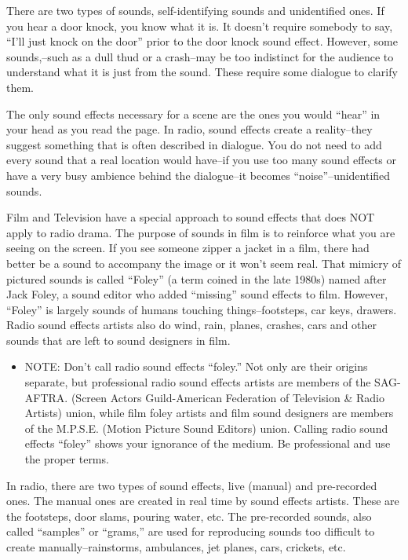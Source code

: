 \documentclass[openleft,oneside,showtrims]{memoir}
\begin{document}
There are two types of sounds, self-identifying sounds and unidentified ones. If you hear a door knock, you know what it is. It doesn't require somebody to say, ``I'll just knock on the door'' prior to the door knock sound effect. However, some sounds,--such as a dull thud or a crash--may be too indistinct for the audience to understand what it is just from the sound. These require some dialogue to clarify them.

The only sound effects necessary for a scene are the ones you would ``hear'' in your head as you read the page. In radio, sound effects create a reality--they suggest something that is often described in dialogue. You do not need to add every sound that a real location would have--if you use too many sound effects or have a very busy ambience behind the dialogue--it becomes ``noise''--unidentified sounds.

Film and Television have a special approach to sound effects that does NOT apply to radio drama. The purpose of sounds in film is to reinforce what you are seeing on the screen. If you see someone zipper a jacket in a film, there had better be a sound to accompany the image or it won't seem real. That mimicry of pictured sounds is called ``Foley'' (a term coined in the late 1980s) named after Jack Foley, a sound editor who added ``missing'' sound effects to film. However, ``Foley'' is largely sounds of humans touching things--footsteps, car keys, drawers. Radio sound effects artists also do wind, rain, planes, crashes, cars and other sounds that are left to sound designers in film.

\begin{itemize}
\item NOTE: Don't call radio sound effects ``foley.'' Not only are their origins separate, but professional radio sound effects artists are members of the SAG-AFTRA. (Screen Actors Guild-American Federation of Television \& Radio Artists) union, while film foley artists and film sound designers are members of the M.P.S.E. (Motion Picture Sound Editors) union. Calling radio sound effects ``foley'' shows your ignorance of the medium. Be professional and use the proper terms.
\end{itemize}

In radio, there are two types of sound effects, live (manual) and pre-recorded ones. The manual ones are created in real time by sound effects artists. These are the footsteps, door slams, pouring water, etc. The pre-recorded sounds, also called ``samples'' or ``grams,'' are used for reproducing sounds too difficult to create manually--rainstorms, ambulances, jet planes, cars, crickets, etc.
\end{document}
